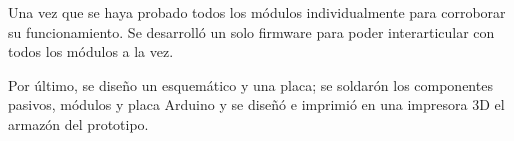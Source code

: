\par \noindent
Una vez que se haya probado todos los módulos individualmente para corroborar su funcionamiento. Se desarrolló un solo firmware para poder interarticular con todos los módulos a la vez. 

\par \noindent
Por último, se diseño un esquemático y una placa; se soldarón los componentes pasivos, módulos y placa Arduino y se diseñó e imprimió en una impresora 3D el armazón del prototipo.








